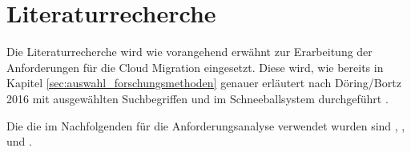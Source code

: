 \section{Literaturrecherche}
Die Literaturrecherche wird wie vorangehend erwähnt zur Erarbeitung der Anforderungen für die Cloud Migration eingesetzt. Diese wird, wie bereits in Kapitel \ref{sec:auswahl_forschungsmethoden} genauer erläutert nach Döring/Bortz 2016 mit ausgewählten Suchbegriffen und im Schneeballsystem durchgeführt \cite[S. 158ff]{Doering2016}.

Die \grqq{} \cite[S. 158]{Doering2016} die im Nachfolgenden für die Anforderungsanalyse verwendet wurden sind \grqq{}, \grqq{}, \grqq{} und \grqq{}. \pagebreak